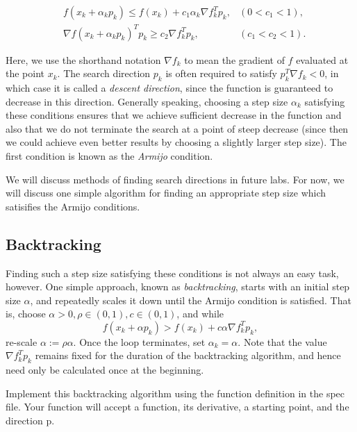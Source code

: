 \begin{align*}
&f(x_k + \alpha_kp_k) \leq f(x_k) + c_1\alpha_k\nabla f_k^Tp_k, &(0 < c_1 < 1),
\\ &\nabla f(x_k + \alpha_kp_k)^Tp_k \geq c_2\nabla f_k^Tp_k, &(c_1 < c_2 < 1).
\end{align*}

Here, we use the shorthand notation $\nabla f_k$ to mean the gradient of $f$ evaluated at the point $x_k$.
The search direction $p_k$ is often required to satisfy $p_k^T \nabla f_k < 0$, in which case it is called a \emph{descent direction}, since the function is guaranteed to decrease in this direction.
Generally speaking, choosing a step size $\alpha_k$ satisfying these conditions ensures that we achieve sufficient decrease in the function and also that we do not terminate the search at a point of steep decrease (since then we could achieve even better results by choosing a slightly larger step size).
The first condition is known as the \emph{Armijo} condition.

We will discuss methods of finding search directions in future labs.
For now, we will discuss one simple algorithm for finding an appropriate step size which satisifies the Armijo conditions.

\subsection*{Backtracking}

Finding such a step size satisfying these conditions is not always an easy task, however.
One simple approach, known as \emph{backtracking}, starts with an initial step size $\alpha$, and repeatedly scales it down until the Armijo condition is satisfied.
That is, choose $\alpha >0, \rho \in (0, 1), c\in (0, 1)$, and while
$$
f(x_k + \alpha p_k) > f(x_k) + c\alpha\nabla f_k^Tp_k,
$$
re-scale $\alpha := \rho\alpha$.
Once the loop terminates, set $\alpha_k = \alpha$.
Note that the value $\nabla f_k^Tp_k$ remains fixed for the duration of the backtracking algorithm, and hence need only be calculated once at the beginning.

\begin{problem}
Implement this backtracking algorithm using the function definition in the spec file.
Your function will accept a function, its derivative, a starting point, and the direction p.
\end{problem}

